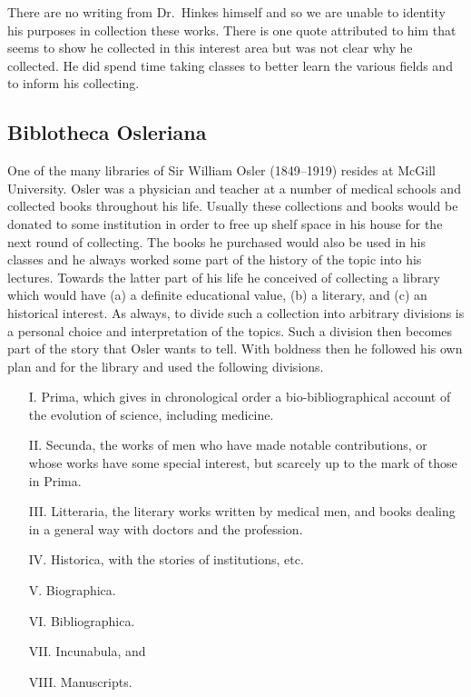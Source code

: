 \documentclass[letterpaper]{article}
\begin{document}
There are no writing from Dr.~Hinkes himself and so we are unable to
identity his purposes in collection these works.  There is one quote
attributed to him that seems to show he collected in this interest
area but was not clear why he collected.  He did spend time taking
classes to better learn the various fields and to inform his
collecting.


\subsection{Biblotheca Osleriana}

One of the many libraries of Sir William Osler (1849--1919) resides at
McGill University.  Osler was a physician and teacher at a number of
medical schools and collected books throughout his life.  Usually
these collections and books would be donated to some institution in
order to free up shelf space in his house for the next round of
collecting.  The books he purchased would also be used in his classes
and he always worked some part of the history of the topic into his
lectures.  Towards the latter part of his life he conceived of
collecting a library which would have (a) a definite educational
value, (b) a literary, and (c) an historical interest. As always, to
divide such a collection into arbitrary divisions is a personal choice
and interpretation of the topics.  Such a division then becomes part
of the story that Osler wants to tell.  With boldness then he followed
his own plan and for the library and used the following divisions.

\begin{itemize}
\item[I.] Prima, which gives in chronological order a
  bio-bibliographical account of the evolution of science, including
  medicine.
\item[II.] Secunda, the works of men who have made notable
  contributions, or whose works have some special interest, but
  scarcely up to the mark of those in Prima.
\item[III.] Litteraria, the literary works written by medical men, and
  books dealing in a general way with doctors and the profession.
\item[IV.] Historica, with the stories of institutions, etc.
\item[V.] Biographica.
\item[VI.] Bibliographica.
\item[VII.] Incunabula, and
\item[VIII.] Manuscripts.
\end{itemize}
\end{document}
